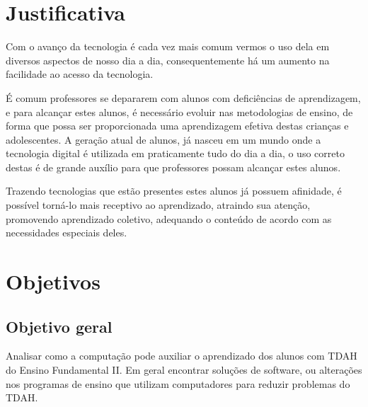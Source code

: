 


\section{Justificativa}

Com o avanço da tecnologia é cada vez mais comum vermos o uso dela em diversos aspectos de nosso dia a dia, consequentemente há um aumento na facilidade ao acesso da tecnologia.

É comum professores se depararem com alunos com deficiências de aprendizagem, e para alcançar estes alunos, é necessário evoluir nas metodologias de ensino, de forma que possa ser proporcionada uma aprendizagem efetiva destas crianças e adolescentes. A geração atual de alunos, já nasceu em um mundo onde a tecnologia digital é utilizada em praticamente tudo do dia a dia, o uso correto destas é de grande auxílio para que professores possam alcançar estes alunos.

Trazendo tecnologias que estão presentes estes alunos já possuem afinidade, é possível torná-lo mais receptivo ao aprendizado, atraindo sua atenção, promovendo aprendizado coletivo, adequando o conteúdo de acordo com as necessidades especiais deles.


\section{Objetivos}
\subsection{Objetivo geral}

Analisar como a computação pode auxiliar o aprendizado dos alunos com TDAH do Ensino Fundamental II. Em geral encontrar soluções de software, ou alterações nos programas de ensino que utilizam computadores para reduzir problemas do TDAH.

